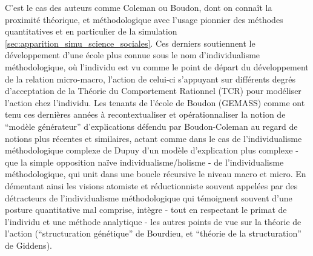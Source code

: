 C'est le cas des auteurs comme Coleman ou Boudon, dont on connaît la proximité théorique, et méthodologique avec l'usage pionnier des méthodes quantitatives et en particulier de la simulation \ref{sec:apparition_simu_science_sociales}. Ces derniers soutiennent le développement d'une école plus connue sous le nom d'individualisme méthodologique, où l'individu est vu comme le point de départ du développement de la relation micro-macro, l'action de celui-ci s'appuyant sur différents degrés d'acceptation de la Théorie du Comportement Rationnel (TCR) pour modéliser l'action chez l'individu. Les tenants de l'école de Boudon (GEMASS) comme \textcite{Manzo2007, Manzo2005} ont tenu ces dernières années à recontextualiser et opérationnaliser  la notion de \enquote{modèle générateur} d'explications défendu par Boudon-Coleman au regard de notions plus récentes et similaires, actant comme dans le cas de l'individualisme méthodologique complexe de Dupuy d'un modèle d'explication plus complexe - que la simple opposition naïve individualisme/holisme - de l'individualisme méthodologique, qui unit dans une boucle récursive le niveau macro et micro. En démentant ainsi les visions atomiste et réductionniste souvent appelées par des détracteurs de l'individualisme méthodologique qui témoignent souvent d'une posture quantitative mal comprise, \textcite{Manzo2007} intègre - tout en respectant le primat de l'individu et une méthode analytique - les autres points de vue sur la théorie de l'action (\enquote{structuration génétique} de Bourdieu, et \enquote{théorie de la structuration} de Giddens).


